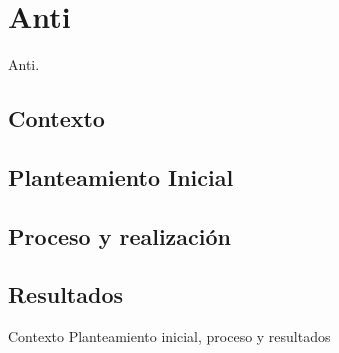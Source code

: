 \section{Anti}


Anti.

\subsection{Contexto}
\subsection{Planteamiento Inicial}
\subsection{Proceso y realización}
\subsection{Resultados}

Contexto
Planteamiento inicial, proceso y resultados 
